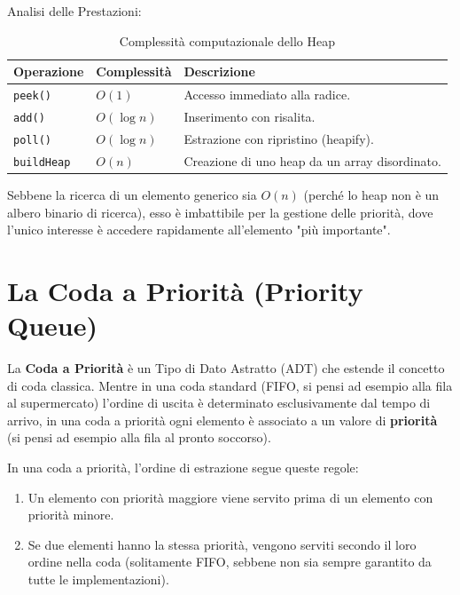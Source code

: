 \medskip

Analisi delle Prestazioni:

\begin{table}[ht]
\centering
\begin{tabular}{|l|l|l|}
\hline
\textbf{Operazione} & \textbf{Complessità} & \textbf{Descrizione} \\ \hline
\texttt{peek()}     & $O(1)$               & Accesso immediato alla radice. \\ \hline
\texttt{add()}      & $O(\log n)$          & Inserimento con risalita. \\ \hline
\texttt{poll()}     & $O(\log n)$          & Estrazione con ripristino (heapify). \\ \hline
\texttt{buildHeap}  & $O(n)$               & Creazione di uno heap da un array disordinato. \\ \hline
\end{tabular}
\caption{Complessità computazionale dello Heap}
\end{table}

\begin{observation}
Sebbene la ricerca di un elemento generico sia $O(n)$ (perché lo heap non è un albero binario di ricerca), esso è imbattibile per la gestione delle priorità, dove l'unico interesse è accedere rapidamente all'elemento "più importante".
\end{observation}

\section{La Coda a Priorità (Priority Queue)}
\label{codaAPriorità}

La \textbf{Coda a Priorità} è un Tipo di Dato Astratto (ADT) che estende il concetto di coda classica. Mentre in una coda standard (FIFO, si pensi ad esempio alla fila al supermercato) l'ordine di uscita è determinato esclusivamente dal tempo di arrivo, in una coda a priorità ogni elemento è associato a un valore di \textbf{priorità} (si pensi ad esempio alla fila al pronto soccorso).

In una coda a priorità, l'ordine di estrazione segue queste regole:
\begin{enumerate}
    \item Un elemento con priorità maggiore viene servito prima di un elemento con priorità minore.
    \item Se due elementi hanno la stessa priorità, vengono serviti secondo il loro ordine nella coda (solitamente FIFO, sebbene non sia sempre garantito da tutte le implementazioni).
\end{enumerate}

